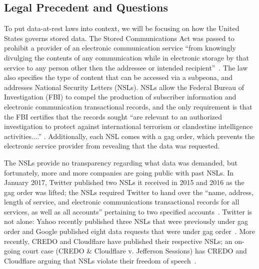 \subsection{Legal Precedent and Questions}

To put data-at-rest laws into context, we will be focusing on how the United
States governs stored data.  The Stored Communications Act was passed to
prohibit a provider of an electronic communication service ``from knowingly
divulging the contents of any communication while in electronic storage by
that service to any person other then the addressee or intended
recipient''~\cite{stored_comm}.  The law also specifies the type of content
that can be accessed via a subpeona, and addresses National Security Letters
(NSLs).  NSLs allow the Federal Bureau of Investigation (FBI) to compel the
production of subscriber information and electronic communication
transactional records, and the only requirement is that the FBI certifies that
the records sought ``are relevant to an authorized investigation to protect
against international terrorism or clandestine intelligence activities....''
\cite{stored_comm}.  Additionally, each NSL comes with a gag order, which
prevents the electronic service provider from revealing that the data was
requested.

The NSLs provide no transparency regarding what data was demanded, but
fortunately, more and more companies are going public with past NSLs.  In
January 2017, Twitter published two NSLs it received in 2015 and 2016 as the
gag order was lifted; the NSLs required Twitter to hand over the ``name,
address, length of service, and electronic communications transactional
records for all services, as well as all accounts'' pertaining to two
specified accounts~\cite{twitter_gag}.  Twitter is not alone: Yahoo recently
published three NSLs that were previously under gag order and Google published
eight data requests that were under gag order~\cite{yahoo_gag,google_gag}.
More recently, CREDO and Cloudflare have published their respective NSLs; an
on-going court case (CREDO \& Cloudflare v. Jefferson Sessions) has CREDO and
Cloudflare arguing that NSLs violate their freedom of
speech~\cite{cloudflare_gag}.

